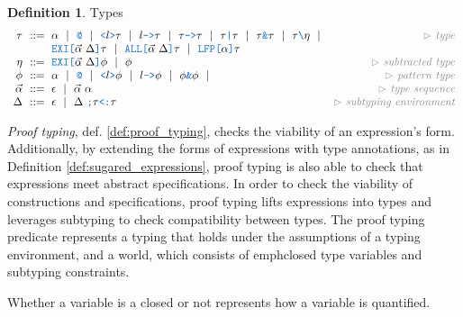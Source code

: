 \documentclass[acmsmall]{acmart}
\theoremstyle{definition}
\newtheorem{definition}{Definition}[section]
\begin{document}
\begin{definition} Types 
  \label{def:types}
  \[\begin{array}[t]{r@{}l@{}r}
    \nonterm{\tau} & \is 
    \begin{array}[t]{@{}l}
      \alpha \sep
      \obj{@} \sep
      \obj{<}l\obj{>}\tau \sep 
      l\obj{->}\tau \sep 
      \tau\obj{->}\tau \sep 
      \tau\obj{|}\tau \sep 
      \tau\obj{\&}\tau \sep 
      \tau\obj{\textbackslash}\eta \sep 
      \\
      \obj{EXI[}\vec{\alpha}\ \Delta \obj{]} \tau \sep 
      \obj{ALL[}\vec{\alpha}\ \Delta \obj{]} \tau \sep 
      \obj{LFP[}\alpha\obj{]}\tau
    \end{array}
    & \com{type}
    \\
    \nonterm{\eta} & \is 
    \begin{array}[t]{@{}l}
      \obj{EXI[}\vec{\alpha}\ \Delta \obj{]} \phi \sep 
      \phi
    \end{array}
    & \com{subtracted type}
    \\
    \nonterm{\phi} & \is 
    \begin{array}[t]{@{}l}
      \alpha \sep
      \obj{@} \sep
      \obj{<}l\obj{>}\phi \sep 
      l\obj{->}\phi \sep 
      \phi\obj{\&}\phi \sep 
    \end{array}
    & \com{pattern type}
    \\
    \nonterm{\vec{\alpha}} & \is \epsilon \sep \vec{\alpha}\ \alpha 
    & \com{type sequence}
    \\
    \nonterm{\Delta} & \is \epsilon \sep \Delta\ \obj{;} \tau \obj{<:} \tau
    & \com{subtyping environment}
  \end{array}\]
\end{definition}

\emph{Proof typing}, def. \ref{def:proof_typing}, checks the viability of an expression's
form. Additionally, by extending the forms of expressions with type annotations, 
as in Definition \ref{def:sugared_expressions},
proof typing is also able to check that expressions meet abstract specifications.
In order to check the viability of constructions and specifications, 
proof typing lifts expressions into types and leverages subtyping to 
check compatibility between types. 
The proof typing predicate represents a typing that holds under the assumptions
of a typing environment, and a world, 
which consists of emph{closed} type variables and subtyping constraints. 

Whether a variable is a closed or not represents how a variable is quantified.
\end{document}
